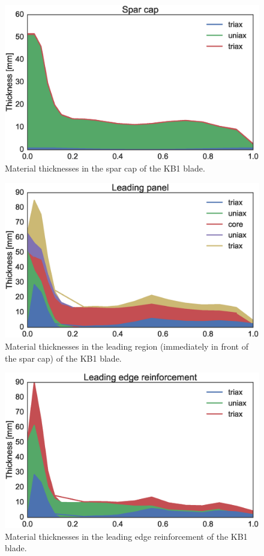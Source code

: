 \begin{figure}[pth]
\begin{center}
	\includegraphics[width=.85\linewidth]{figures/KB1_region04.eps}
\end{center}
\caption{Material thicknesses in the spar cap of the KB1 blade.}
\label{fig:KB1matstackr04}
\end{figure}

\begin{figure}[pth]
\begin{center}
	\includegraphics[width=.85\linewidth]{figures/KB1_region06.eps}
\end{center}
\caption{Material thicknesses in the leading region (immediately in front of the spar cap) of the KB1 blade.}
\label{fig:KB1matstackr06}
\end{figure}

\begin{figure}[pth]
\begin{center}
	\includegraphics[width=.85\linewidth]{figures/KB1_region07.eps}
\end{center}
\caption{Material thicknesses in the leading edge reinforcement of the KB1 blade.}
\label{fig:KB1matstackr07}
\end{figure}


